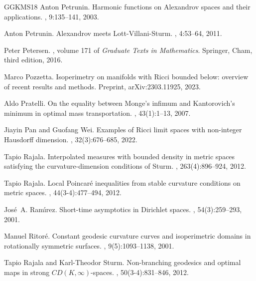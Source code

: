 \documentclass[11pt]{article}
\numberwithin{equation}{section}
\begin{document}
{\begin{thebibliography}{GGKMS18}
Anton Petrunin.
\newblock Harmonic functions on {A}lexandrov spaces and their applications.
, 9:135--141, 2003.

Anton Petrunin.
\newblock Alexandrov meets {L}ott-{V}illani-{S}turm.
, 4:53--64, 2011.

Peter Petersen.
, volume 171 of {\em Graduate Texts in
  Mathematics}.
\newblock Springer, Cham, third edition, 2016.

Marco Pozzetta.
\newblock Isoperimetry on manifolds with {R}icci bounded below: overview of
  recent results and methods.
\newblock Preprint, arXiv:2303.11925, 2023.

Aldo Pratelli.
\newblock On the equality between {M}onge's infimum and {K}antorovich's minimum
  in optimal mass transportation.
, 43(1):1--13, 2007.

Jiayin Pan and Guofang Wei.
\newblock Examples of {R}icci limit spaces with non-integer {H}ausdorff
  dimension.
, 32(3):676--685, 2022.

Tapio Rajala.
\newblock Interpolated measures with bounded density in metric spaces
  satisfying the curvature-dimension conditions of {S}turm.
, 263(4):896--924, 2012.

Tapio Rajala.
\newblock Local {P}oincar\'e inequalities from stable curvature conditions on
  metric spaces.
, 44(3-4):477--494,
  2012.

Jos\'{e}~A. Ram\'{\i}rez.
\newblock Short-time asymptotics in {D}irichlet spaces.
, 54(3):259--293, 2001.

Manuel Ritor\'{e}.
\newblock Constant geodesic curvature curves and isoperimetric domains in
  rotationally symmetric surfaces.
, 9(5):1093--1138, 2001.

Tapio Rajala and Karl-Theodor Sturm.
\newblock Non-branching geodesics and optimal maps in strong
  ${CD(K,{\infty})}$-spaces.
, 50(3-4):831--846,
  2012.


\end{thebibliography}}
\end{document}
